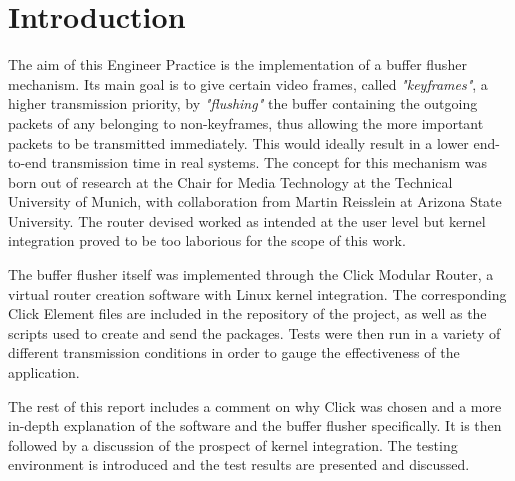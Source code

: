 \chapter{Introduction}
\setcounter{page}{1}
\thispagestyle{empty}

The aim of this Engineer Practice is the implementation of a buffer flusher mechanism. Its main goal is to give certain video frames, called \textit{"keyframes"}, a higher transmission priority, by \textit{"flushing"} the buffer containing the outgoing packets of any belonging to non-keyframes, thus allowing the more important packets to be transmitted immediately. This would ideally result in a lower end-to-end transmission time in real systems. The concept for this mechanism was born out of research at the Chair for Media Technology at the Technical University of Munich, with collaboration from Martin Reisslein at Arizona State University. The router devised worked as intended at the user level but kernel integration proved to be too laborious for the scope of this work.

The buffer flusher itself was implemented through the Click Modular Router, a virtual router creation software with Linux kernel integration. The corresponding Click Element files are included in the repository of the project, as well as the scripts used to create and send the packages. Tests were then run in a variety of different transmission conditions in order to gauge the effectiveness of the application.

The rest of this report includes a comment on why Click was chosen and a more in-depth explanation of the software and the buffer flusher specifically. It is then followed by a discussion of the prospect of kernel integration. The testing environment is introduced and the test results are presented and discussed.

